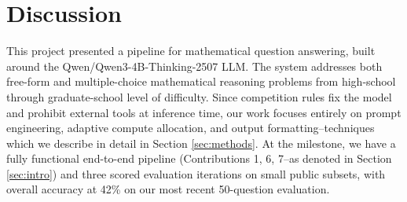 \documentclass{article}
\begin{document}
% 
% 
\section{Discussion}
\label{sec:discussion}
This project presented a pipeline for mathematical question answering, built around the Qwen/Qwen3-4B-Thinking-2507 LLM. The system addresses both free-form and multiple-choice mathematical reasoning problems from high-school through graduate-school level of difficulty. Since competition rules fix the model and prohibit external tools at inference time, our work focuses entirely on prompt engineering, adaptive compute allocation, and output formatting--techniques which we describe in detail in Section \ref{sec:methods}. At the milestone, we have a fully functional end-to-end pipeline (Contributions 1, 6, 7--as denoted in Section \ref{sec:intro}) and three scored evaluation iterations on small public subsets, with overall accuracy at 42\% on our most recent 50-question evaluation.
\end{document}
